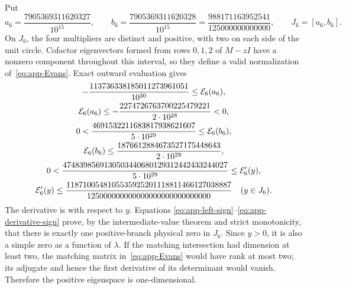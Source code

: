 Put
\[
 a_6=\frac{7905369311620327}{10^{15}},\qquad
 b_6=\frac{7905369311620328}{10^{15}}
     =\frac{988171163952541}{125000000000000},
 \qquad J_6=[a_6,b_6].
\]
On \(J_6\), the four multipliers are distinct and positive, with two on
each side of the unit circle.  Cofactor eigenvectors formed from rows
\(0,1,2\) of \(M-zI\) have a nonzero component throughout this interval,
so they define a valid normalization of~\eqref{eq:app-Evans}.  Exact outward
evaluation gives
\begin{gather}
 -\frac{113736338185011273961051}{10^{30}}
 \leq \mathcal E_6(a_6), \notag\\
 \mathcal E_6(a_6)
 \leq-\frac{2274726763700225479221}{2\cdot10^{28}}<0,
                                                        \label{eq:app-left-sign}\\
 0<\frac{4691532211683817938621607}{5\cdot10^{29}}
 \leq \mathcal E_6(b_6), \notag\\
 \mathcal E_6(b_6)
 \leq\frac{1876612884673527175448643}{2\cdot10^{29}},
                                                        \label{eq:app-right-sign}\\
 0<\frac{4748398569130503440680129312442433244027}
 {5\cdot10^{29}}
 \leq \mathcal E_6'(y), \notag\\
 \mathcal E_6'(y)
 \leq
 \frac{1187100548105535925201118811466127038887}
 {125000000000000000000000000000}
 \quad(y\in J_6).                                    \label{eq:app-derivative-sign}
\end{gather}
The derivative is with respect to \(y\).  Equations
\eqref{eq:app-left-sign}--\eqref{eq:app-derivative-sign} prove, by the
intermediate-value theorem and strict monotonicity, that there is exactly
one positive-branch physical zero in \(J_6\).  Since \(y>0\), it is also a
simple zero as a function of \(\lambda\).  If the matching intersection had
dimension at least two, the matching matrix in~\eqref{eq:app-Evans} would
have rank at most two; its adjugate and hence the first derivative of its
determinant would vanish.  Therefore the positive eigenspace is
one-dimensional.

